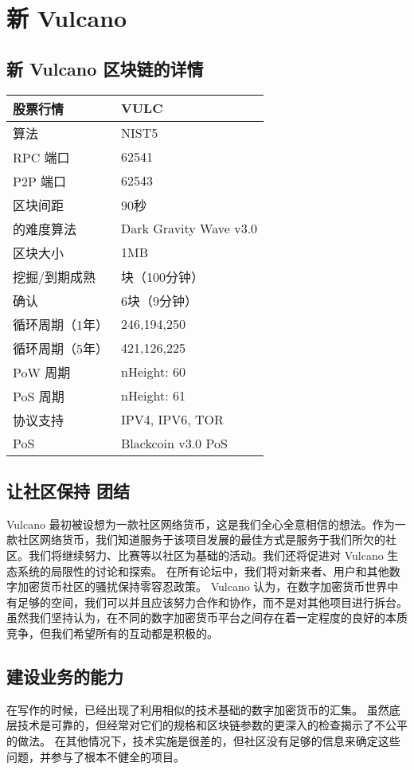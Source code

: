 \documentclass[A4paper, 12pt]{article}
\begin{document}
\section{新 Vulcano}
\subsection{新 Vulcano 区块链的详情}

\begin{table}[h]
\centering
\begin{tabular}{@{}ll@{}}
\toprule
股票行情 & VULC \\ \midrule
算法 & NIST5 \\
RPC 端口 & 62541 \\
P2P 端口 & 62543 \\
区块间距 & 90秒 \\
的难度算法 & Dark Gravity Wave v3.0 \\
区块大小 & 1MB \\
挖掘/到期成熟 & 块（100分钟） \\
确认 & 6块（9分钟） \\
循环周期（1年） & 246,194,250 \\
循环周期（5年） & 421,126,225 \\
PoW 周期 & nHeight: 60 \\
PoS 周期 & nHeight: 61 \\
协议支持 & IPV4, IPV6, TOR \\
PoS & Blackcoin v3.0 PoS \\ \bottomrule
\end{tabular}
\end{table}

\subsection{	让社区保持 团结}
Vulcano 最初被设想为一款社区网络货币，这是我们全心全意相信的想法。作为一款社区网络货币，我们知道服务于该项目发展的最佳方式是服务于我们所欠的社区。我们将继续努力、比赛等以社区为基础的活动。我们还将促进对 Vulcano 生态系统的局限性的讨论和探索。  在所有论坛中，我们将对新来者、用户和其他数字加密货币社区的骚扰保持零容忍政策。  Vulcano 认为，在数字加密货币世界中有足够的空间，我们可以并且应该努力合作和协作，而不是对其他项目进行拆台。  虽然我们坚持认为，在不同的数字加密货币平台之间存在着一定程度的良好的本质竞争，但我们希望所有的互动都是积极的。 

\subsection{建设业务的能力}
在写作的时候，已经出现了利用相似的技术基础的数字加密货币的汇集。  虽然底层技术是可靠的，但经常对它们的规格和区块链参数的更深入的检查揭示了不公平的做法。  在其他情况下，技术实施是很差的，但社区没有足够的信息来确定这些问题，并参与了根本不健全的项目。
\end{document}
